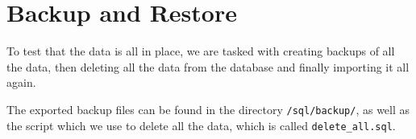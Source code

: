 \section{Backup and Restore}

To test that the data is all in place, we are tasked with creating backups of all the data, then deleting all the data from the database and finally importing it all again.

The exported backup files can be found in the directory \verb`/sql/backup/`, as well as the script which we use to delete all the data, which is called \verb`delete_all.sql`.

